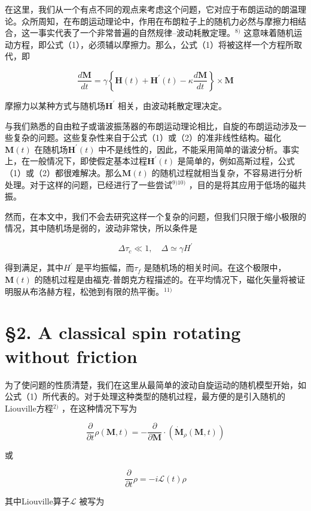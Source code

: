 \documentclass[10pt]{article}
\begin{document}
在这里，我们从一个有点不同的观点来考虑这个问题，它对应于布朗运动的朗温理论。众所周知，在布朗运动理论中，作用在布朗粒子上的随机力必然与摩擦力相结合，这一事实代表了一个非常普遍的自然规律--波动耗散定理。\({ }^{8)}\) 这意味着随机运动方程，即公式（1），必须辅以摩擦力。那么，公式（1）将被这样一个方程所取代，即

\[
\frac{d \boldsymbol{M}}{d t}=\gamma\left\{\boldsymbol{H}(t)+\boldsymbol{H}^{\prime}(t)-\kappa \frac{d \boldsymbol{M}}{d t}\right\} \times \boldsymbol{M}
\] 

摩擦力以某种方式与随机场\(\boldsymbol{H}^{\prime}\) 相关，由波动耗散定理决定。

与我们熟悉的自由粒子或谐波振荡器的布朗运动理论相比，自旋的布朗运动涉及一些复杂的问题。这些复杂性来自于公式（1）或（2）的准非线性结构。磁化\(\boldsymbol{M}(t)\) 在随机场\(\boldsymbol{H}^{\prime}(t)\) 中不是线性的，因此，不能采用简单的谐波分析。事实上，在一般情况下，即使假定基本过程\(\boldsymbol{H}^{\prime}(t)\) 是简单的，例如高斯过程，公式（1）或（2）都很难解决。那么\(\boldsymbol{M}(t)\) 的随机过程就相当复杂，不容易进行分析处理。对于这样的问题，已经进行了一些尝试\(^{9) 10)}\) ，目的是将其应用于低场的磁共振。

然而，在本文中，我们不会去研究这样一个复杂的问题，但我们只限于缩小极限的情况，其中随机场是弱的，波动非常快，所以条件是

\[
\Delta \tau_{c} \ll 1, \quad \Delta \simeq \gamma H^{\prime}
\] 

得到满足，其中\(H^{\prime}\) 是平均振幅，而\(\tau_{f}\) 是随机场的相关时间。在这个极限中，\(\boldsymbol{M}(t)\) 的随机过程是由福克-普朗克方程描述的。在平均情况下，磁化矢量将被证明服从布洛赫方程，松弛到有限的热平衡。\({ }^{11)}\) 

\section{§2. A classical spin rotating without friction} 
为了使问题的性质清楚，我们在这里从最简单的波动自旋运动的随机模型开始，如公式（1）所代表的。对于处理这种类型的随机过程，最方便的是引入随机的Liouville方程\({ }^{2)}\) ，在这种情况下写为

\[
\frac{\partial}{\partial t} \rho(\boldsymbol{M}, t)=-\frac{\partial}{\partial \boldsymbol{M}} \cdot\left(\dot{\boldsymbol{M}}_{\rho}(\boldsymbol{M}, t)\right)
\] 

或

\[
\frac{\partial}{\partial t} \rho=-i \mathcal{L}(t) \rho
\] 

其中Liouville算子\(\mathcal{L}\) 被写为
\end{document}
